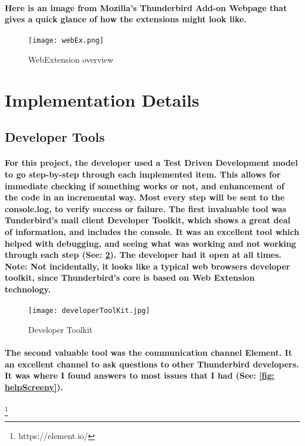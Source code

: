 \paragraph{Here is an image from Mozilla's Thunderbird Add-on Webpage that gives a quick glance of how the extensions might look like.} \cite[Webpage]{WebEx}

\begin{figure}[H]
\centering
\texttt{[image: webEx.png]}
\caption{\label{fig: webEx} WebExtension overview}
\end{figure}


\section{Implementation Details}

\subsection{Developer Tools}

\paragraph{For this project, the developer used a Test Driven Development model to go step-by-step through each implemented item. This allows for immediate checking if something works or not, and enhancement of the code in an incremental way. Most every step will be sent to the console.log, to verify success or failure. The first invaluable tool was Tunderbird's mail client Developer Toolkit, which shows a great deal of information, and includes the console. It was an excellent tool which helped with debugging, and seeing what was working and not working through each step (See: \ref{fig: devToolkit}). The developer had it open at all times. Note: Not incidentally, it looks like a typical web browsers developer toolkit, since Thunderbird's core is based on Web Extension technology.}


\begin{figure}[H]
\centering
\texttt{[image: developerToolKit.jpg]}
\caption{\label{fig: devToolkit} Developer Toolkit}
\end{figure}

\paragraph{The second valuable tool was the communication channel Element. It an excellent channel to ask questions to other Thunderbird developers. It was where I found answers to most issues that I had (See: \ref{fig: helpScreeny}).}\footnote{https://element.io/}

